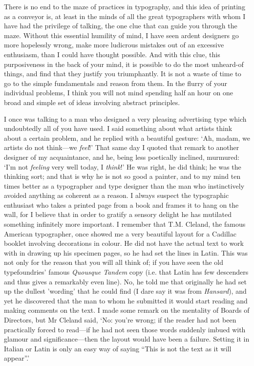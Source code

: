 \documentclass[12pt]{article}
\begin{document}
There is no end to the maze of practices in typography, and this idea of printing as a conveyor is, at least in the minds of all the great typographers with whom I have had the privilege of talking, the one clue that can guide you through the maze. Without this essential humility of mind, I have seen ardent designers go more hopelessly wrong, make more ludicrous mistakes out of an excessive enthusiasm, than I could have thought possible. And with this clue, this purposiveness in the back of your mind, it is possible to do the most unheard-of things, and find that they justify you triumphantly. It is not a waste of time to go to the simple fundamentals and reason from them. In the flurry of your individual problems, I think you will not mind spending half an hour on one broad and simple set of ideas involving abstract principles.

I once was talking to a man who designed a very pleasing advertising type which undoubtedly all of you have used. I said something about what artists think about a certain problem, and he replied with a beautiful gesture: `Ah, madam, we artists do not think---we \emph{feel}!' That same day I quoted that remark to another designer of my acquaintance, and he, being less poetically inclined, murmured: `I'm not \emph{feeling} very well today, I \emph{think}!' He was right, he did think; he was the thinking sort; and that is why he is not so good a painter, and to my mind ten times better as a typographer and type designer than the man who instinctively avoided anything as coherent as a reason. I always suspect the typographic enthusiast who takes a printed page from a book and frames it to hang on the wall, for I believe that in order to gratify a sensory delight he has mutilated something infinitely more important. I remember that T.M. Cleland, the famous American typographer, once showed me a very beautiful layout for a Cadillac booklet involving decorations in colour. He did not have the actual text to work with in drawing up his specimen pages, so he had set the lines in Latin. This was not only for the reason that you will all think of; if you have seen the old typefoundries' famous \emph{Quousque Tandem} copy (i.e. that Latin has few descenders and thus gives a remarkably even line). No, he told me that originally he had set up the dullest 'wording' that he could find (I dare say it was from \emph{Hansard}), and yet he discovered that the man to whom he submitted it would start reading and making comments on the text. I made some remark on the mentality of Boards of Directors, but Mr Cleland said, `No: you're wrong; if the reader had not been practically forced to read---if he had not seen those words suddenly imbued with glamour and significance---then the layout would have been a failure. Setting it in Italian or Latin is only an easy way of saying ``This is not the text as it will appear''.'
\end{document}

